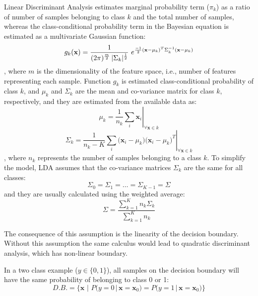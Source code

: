 Linear Discriminant Analysis estimates marginal probability term ($\pi_k$) as a ratio of number of samples belonging to class $k$ and the total  number of samples, whereas the class-conditional probability term in the Bayesian equation is estimated as a multivariate Gaussian function:
\begin{equation} 
g_k(\mathbf{x}) = \frac{1}{(2 \pi)^{\nicefrac{m}{2}}\, |\Sigma_k|^{\nicefrac{1}{2}}}\,\, e^{\nicefrac{-1}{2}  (\mathbf{x}-\mu_k)^T  \Sigma_k^{-1} (\mathbf{x}-\mu_k)} 
\end{equation}
\noindent
, where $m$ is the dimensionality of the feature space, i.e., number of features representing each sample. Function $g_k$ is estimated class-conditional probability of class $k$, and $\mu_k$ and $\Sigma_k$ are the mean and co-variance matrix for class $k$, respectively, and they are estimated from the available data as:
\begin{equation}
\left. \mu_k = \frac{1}{n_k} \sum_{i}{\mathbf{x}_i} \right\vert_{\forall \mathbf{x} \in k}
\end{equation}
\begin{equation}
\left. \Sigma_k = \frac{1}{n_k-K} \sum_{i}{\Big( \mathbf{x}_i - \mu_k \Big) \Big( \mathbf{x}_i - \mu_k \Big)^T} \right\vert_{\forall \mathbf{x} \in k}
\end{equation}
\noindent
, where $n_k$ represents the number of samples belonging to a class $k$.
To simplify the model, LDA assumes that the co-variance matrices $\Sigma_k$ are the same for all classes:
\begin{equation} 
\Sigma_0 = \Sigma_1 = \dots = \Sigma_{K-1} = \Sigma
\end{equation}
\noindent
and they are usually calculated using the weighted average:
\begin{equation} 
\Sigma = \frac{\sum_{k=1}^K {n_k\Sigma_k}}{\sum_{k=1}^K{n_k}}
\end{equation}

\noindent
The consequence of this assumption is the linearity of the decision boundary. Without this assumption the same calculus would lead to quadratic discriminant analysis, which has non-linear boundary.

In a two class example ($y \in \{0,1\}$), all samples on the decision boundary will have the same probability of belonging to class 0 or 1:
\begin{equation} 
D.B. = \Big\{\mathbf{x}\,\, \Big| \,\,P\big(y=0 \, \big| \, \mathbf{x}=\mathbf{x}_0\big) = P\big(y=1 \, \big| \, \mathbf{x}=\mathbf{x}_0\big) \Big\}
\end{equation}

